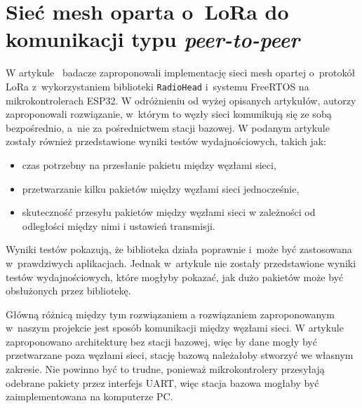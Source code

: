 \section{Sieć mesh oparta o~LoRa do komunikacji typu \emph{peer-to-peer}}
W artykule~\cite{s21134314} badacze zaproponowali implementację sieci mesh opartej o~protokół LoRa z~wykorzystaniem biblioteki \texttt{RadioHead} i~systemu FreeRTOS na mikrokontrolerach ESP32.
W odróżnieniu od wyżej opisanych artykułów, autorzy zaproponowali rozwiązanie, w~którym to węzły sieci komunikują się ze sobą bezpośrednio, a~nie za pośrednictwem stacji bazowej.
W podanym artykule zostały również przedstawione wyniki testów wydajnościowych, takich jak:
\begin{itemize}
    \item czas potrzebny na przesłanie pakietu między węzłami sieci,
    \item przetwarzanie kilku pakietów między węzłami sieci jednocześnie,
    \item skuteczność przesyłu pakietów między węzłami sieci w zależności od odległości między nimi i ustawień transmisji.
\end{itemize}

Wyniki testów pokazują, że biblioteka działa poprawnie i~może być zastosowana w~prawdziwych aplikacjach.
Jednak w~artykule nie zostały przedstawione wyniki testów wydajnościowych, które mogłyby pokazać, jak dużo pakietów może być obsłużonych przez bibliotekę.

Główną różnicą między tym rozwiązaniem a rozwiązaniem zaproponowanym w~naszym projekcie jest sposób komunikacji między węzłami sieci.
W artykule zaproponowano architekturę bez stacji bazowej, więc by dane mogły być przetwarzane poza węzłami sieci, stację bazową należałoby stworzyć we własnym zakresie.
Nie powinno być to trudne, ponieważ mikrokontrolery przesyłają odebrane pakiety przez interfejs UART, więc stacja bazowa mogłaby być zaimplementowana na komputerze PC.
